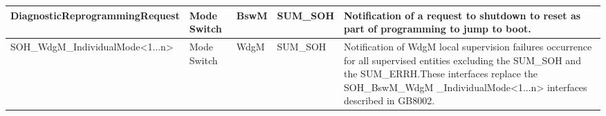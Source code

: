 \begin{longtable}{|l|l|l|l|l|}
\begin{minipage}{0.39\linewidth}\raggedright\vspace{.75ex}DiagnosticReprogrammingRequest\vspace{.75ex}\end{minipage} & \begin{minipage}{0.07\linewidth}\raggedright\vspace{.75ex}Mode Switch\vspace{.75ex}\end{minipage} & \begin{minipage}{0.11\linewidth}\raggedright\vspace{.75ex}BswM\vspace{.75ex}\end{minipage} & \begin{minipage}{0.11\linewidth}\raggedright\vspace{.75ex}SUM\_SOH\vspace{.75ex}\end{minipage} & \begin{minipage}{0.16\linewidth}\raggedright\vspace{.75ex}Notification of a request to shutdown to reset as part of programming to jump to boot.\vspace{.75ex}\end{minipage}\\\hline
\begin{minipage}{0.39\linewidth}\raggedright\vspace{.75ex}SOH\_WdgM\_IndividualMode<1...n>\vspace{.75ex}\end{minipage} & \begin{minipage}{0.07\linewidth}\raggedright\vspace{.75ex}Mode Switch\vspace{.75ex}\end{minipage} & \begin{minipage}{0.11\linewidth}\raggedright\vspace{.75ex}WdgM\vspace{.75ex}\end{minipage} & \begin{minipage}{0.11\linewidth}\raggedright\vspace{.75ex}SUM\_SOH\vspace{.75ex}\end{minipage} & \begin{minipage}{0.16\linewidth}\raggedright\vspace{.75ex}Notification of WdgM local supervision failures occurrence for all supervised entities excluding the SUM\_SOH and the SUM\_ERRH.\newline \footnotesize{These interfaces replace the SOH\_BswM\_WdgM \_IndividualMode<1...n> interfaces described in GB8002.}\vspace{.75ex}\end{minipage}\\\hline

\end{longtable}
